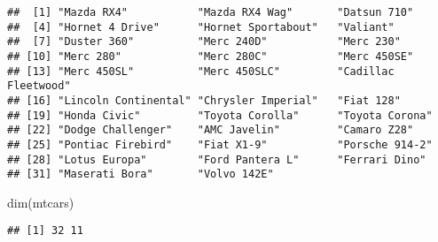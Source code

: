 \documentclass[
]{article}
\newenvironment{Shaded}{\begin{snugshade}}{\end{snugshade}}
\newcommand{\DecValTok}[1]{\textcolor[rgb]{0.00,0.00,0.81}{#1}}
\newcommand{\FunctionTok}[1]{\textcolor[rgb]{0.00,0.00,0.00}{#1}}
\newcommand{\NormalTok}[1]{#1}
\newcommand{\OtherTok}[1]{\textcolor[rgb]{0.56,0.35,0.01}{#1}}
\newcommand{\SpecialCharTok}[1]{\textcolor[rgb]{0.00,0.00,0.00}{#1}}
\begin{document}
\begin{verbatim}
##  [1] "Mazda RX4"           "Mazda RX4 Wag"       "Datsun 710"         
##  [4] "Hornet 4 Drive"      "Hornet Sportabout"   "Valiant"            
##  [7] "Duster 360"          "Merc 240D"           "Merc 230"           
## [10] "Merc 280"            "Merc 280C"           "Merc 450SE"         
## [13] "Merc 450SL"          "Merc 450SLC"         "Cadillac Fleetwood" 
## [16] "Lincoln Continental" "Chrysler Imperial"   "Fiat 128"           
## [19] "Honda Civic"         "Toyota Corolla"      "Toyota Corona"      
## [22] "Dodge Challenger"    "AMC Javelin"         "Camaro Z28"         
## [25] "Pontiac Firebird"    "Fiat X1-9"           "Porsche 914-2"      
## [28] "Lotus Europa"        "Ford Pantera L"      "Ferrari Dino"       
## [31] "Maserati Bora"       "Volvo 142E"
\end{verbatim}

\begin{Shaded}
\begin{Highlighting}[]
\FunctionTok{dim}\NormalTok{(mtcars)}
\end{Highlighting}
\end{Shaded}

\begin{verbatim}
## [1] 32 11
\end{verbatim}

\begin{Shaded}
\end{Shaded}
\end{document}
